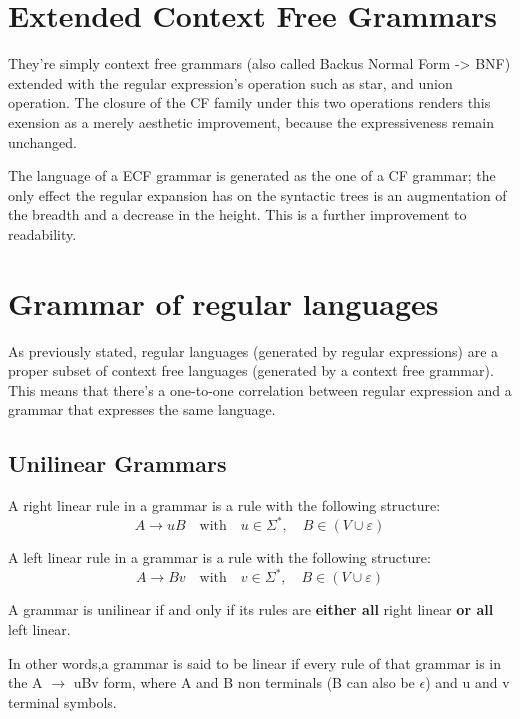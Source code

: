 	\section{Extended Context Free Grammars}
		They're simply context free grammars (also called Backus Normal Form -> BNF) extended with the regular expression's operation such as star, and union 
		operation. The closure of the CF family under this two operations renders this exension as a merely aesthetic improvement, because the expressiveness 
		remain unchanged.

		The language of a ECF grammar is generated as the one of a CF grammar; the only effect the regular expansion has on the syntactic trees is an augmentation 
		of the breadth and a decrease in the height. This is a further improvement to readability.
	
	\section{Grammar of regular languages}
		As previously stated, regular languages (generated by regular expressions) are a proper subset of context free languages (generated by a context free 
		grammar). This means that there's a one-to-one correlation between regular expression and a grammar that expresses the same language. 
		\subsection{Unilinear Grammars}
		\label{sec:uni_linear_grammars}
			\begin{definition}
				A right linear rule in a grammar is a rule with the following structure:
				$$A\longrightarrow uB\quad\mbox{with}\quad u\in\Sigma^*,\quad B\in(V\cup\varepsilon)$$
			\end{definition}
			\begin{definition}
				A left linear rule in a grammar is a rule with the following structure:
				$$A\longrightarrow Bv\quad\mbox{with}\quad v\in\Sigma^*,\quad B\in(V\cup\varepsilon)$$
			\end{definition}
			\begin{definition}
				A grammar is unilinear if and only if its rules are \textbf{either all} right linear \textbf{or all} left linear.
			\end{definition}
			In other words,a grammar is said to be linear if every rule of that grammar is in the A $\rightarrow$ uBv form, where A and B non terminals (B can also be 
			$\epsilon$) and u and v terminal symbols.

